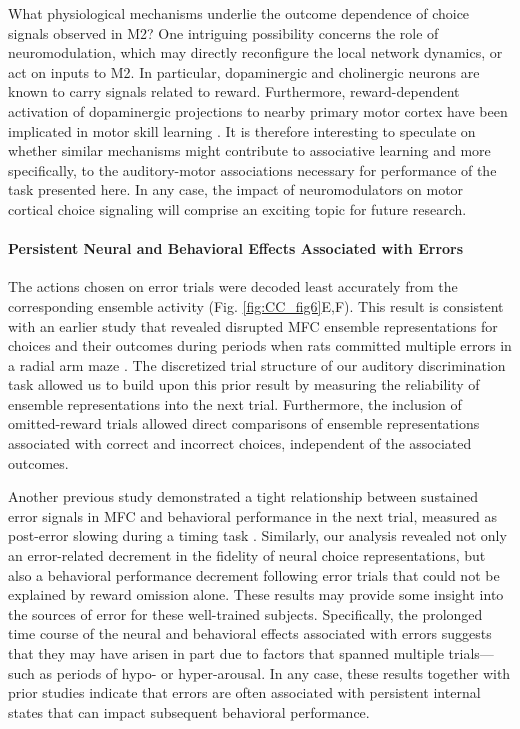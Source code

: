 What physiological mechanisms underlie the outcome dependence of choice signals observed in M2? One intriguing possibility concerns the role of neuromodulation, which may directly reconfigure the local network dynamics, or act on inputs to M2. In particular, dopaminergic \citep{schultz1997neural} and cholinergic \citep{hangya2015central} neurons are known to carry signals related to reward. Furthermore, reward-dependent activation of dopaminergic projections to nearby primary motor cortex have been implicated in motor skill learning \citep{hosp2011dopaminergic, leemburg2018motor}. It is therefore interesting to speculate on whether similar mechanisms might contribute to associative learning \citep{takehara2008spontaneous} and more specifically, to the auditory-motor associations necessary for performance of the task presented here. In any case, the impact of neuromodulators on motor cortical choice signaling will comprise an exciting topic for future research.

\paragraph{Persistent Neural and Behavioral Effects Associated with Errors}
The actions chosen on error trials were decoded least accurately from the corresponding ensemble activity (Fig. \ref{fig:CC_fig6}E,F). This result is consistent with an earlier study that revealed disrupted MFC ensemble representations for choices and their outcomes during periods when rats committed multiple errors in a radial arm maze \citep{lapish2008successful, hyman2012action}. The discretized trial structure of our auditory discrimination task allowed us to build upon this prior result by measuring the reliability of ensemble representations into the next trial. Furthermore, the inclusion of omitted-reward trials allowed direct comparisons of ensemble representations associated with correct and incorrect choices, independent of the associated outcomes.

Another previous study demonstrated a tight relationship between sustained error signals in MFC and behavioral performance in the next trial, measured as post-error slowing during a timing task \citep{narayanan2013common}. Similarly, our analysis revealed not only an error-related decrement in the fidelity of neural choice representations, but also a behavioral performance decrement following error trials that could not be explained by reward omission alone. These results may provide some insight into the sources of error for these well-trained subjects. Specifically, the prolonged time course of the neural and behavioral effects associated with errors suggests that they may have arisen in part due to factors that spanned multiple trials—such as periods of hypo- or hyper-arousal. In any case, these results together with prior studies indicate that errors are often associated with persistent internal states that can impact subsequent behavioral performance.

